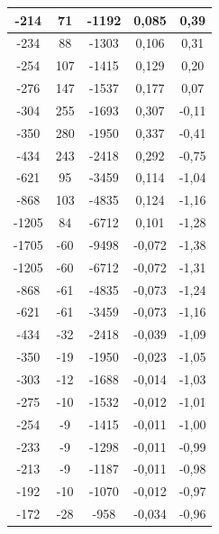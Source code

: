 \documentclass[a4paper,12pt]{article} %
\begin{document}
\begin{longtable}[c]{|c|c|c|c|c|}
		-214    & 71             & -1192    & 0,085          & 0,39    \\ \hline
		-234    & 88             & -1303    & 0,106          & 0,31    \\ \hline
		-254    & 107            & -1415    & 0,129          & 0,20    \\ \hline
		-276    & 147            & -1537    & 0,177          & 0,07    \\ \hline
		-304    & 255            & -1693    & 0,307          & -0,11   \\ \hline
		-350    & 280            & -1950    & 0,337          & -0,41   \\ \hline
		-434    & 243            & -2418    & 0,292          & -0,75   \\ \hline
		-621    & 95             & -3459    & 0,114          & -1,04   \\ \hline
		-868    & 103            & -4835    & 0,124          & -1,16   \\ \hline
		-1205   & 84             & -6712    & 0,101          & -1,28   \\ \hline
		-1705   & -60            & -9498    & -0,072         & -1,38   \\ \hline
		-1205   & -60            & -6712    & -0,072         & -1,31   \\ \hline
		-868    & -61            & -4835    & -0,073         & -1,24   \\ \hline
		-621    & -61            & -3459    & -0,073         & -1,16   \\ \hline
		-434    & -32            & -2418    & -0,039         & -1,09   \\ \hline
		-350    & -19            & -1950    & -0,023         & -1,05   \\ \hline
		-303    & -12            & -1688    & -0,014         & -1,03   \\ \hline
		-275    & -10            & -1532    & -0,012         & -1,01   \\ \hline
		-254    & -9             & -1415    & -0,011         & -1,00   \\ \hline
		-233    & -9             & -1298    & -0,011         & -0,99   \\ \hline
		-213    & -9             & -1187    & -0,011         & -0,98   \\ \hline
		-192    & -10            & -1070    & -0,012         & -0,97   \\ \hline
		-172    & -28            & -958     & -0,034         & -0,96   \\ \hline

\end{longtable}
\end{document}

